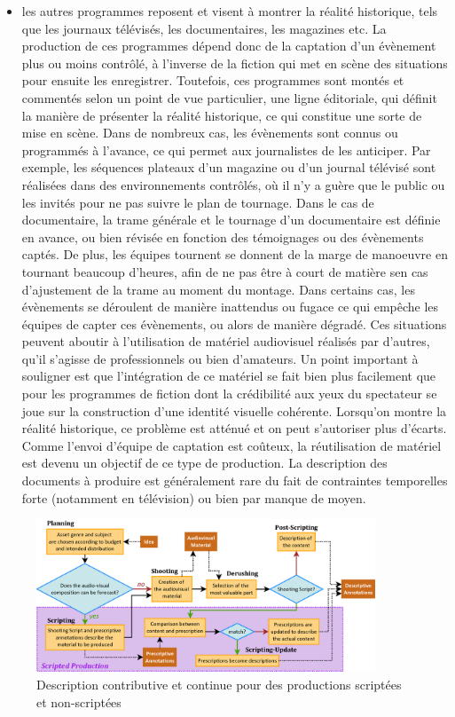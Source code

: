 \begin{itemize}
	\item les autres programmes reposent et visent à montrer la réalité historique, tels que les journaux télévisés, les documentaires, les magazines etc.
	La production de ces programmes dépend donc de la captation d'un évènement plus ou moins contrôlé, à l'inverse de la fiction qui met en scène des situations pour ensuite les enregistrer.
	Toutefois, ces programmes sont montés et commentés selon un point de vue particulier, une ligne éditoriale, qui définit la manière de présenter la réalité historique, ce qui constitue une sorte de mise en scène.
	Dans de nombreux cas, les évènements sont connus ou programmés à l'avance, ce qui permet aux journalistes de les anticiper. 
	Par exemple, les séquences plateaux d'un magazine ou d'un journal télévisé sont réalisées dans des environnements contrôlés, où il n'y a guère que le public ou les invités pour ne pas suivre le plan de tournage.
	Dans le cas de documentaire, la trame générale et le tournage d'un documentaire est définie en avance, ou bien révisée en fonction des témoignages ou des évènements captés. 
	De plus, les équipes tournent se donnent de la marge de manoeuvre en tournant beaucoup d'heures, afin de ne pas être à court de matière sen cas d'ajustement de la trame au moment du montage.
	Dans certains cas, les évènements se déroulent de manière inattendus ou fugace ce qui empêche les équipes de capter ces évènements, ou alors de manière dégradé.
	Ces situations peuvent aboutir à l'utilisation de matériel audiovisuel réalisés par d'autres, qu'il s'agisse de professionnels ou bien d'amateurs.
	Un point important à souligner est que l'intégration de ce matériel se fait bien plus facilement que pour les programmes de fiction dont la crédibilité aux yeux du spectateur se joue sur la construction d'une identité visuelle cohérente. 
	Lorsqu'on montre la réalité historique, ce problème est atténué et on peut s'autoriser plus d'écarts.
	Comme l'envoi d'équipe de captation est coûteux, la réutilisation de matériel est devenu un objectif de ce type de production. 
	La description des documents à produire est généralement rare du fait de contraintes temporelles forte (notamment en télévision) ou bien par manque de moyen.
\end{itemize}


\begin{figure}[ht!]
\centering
\includegraphics[width=0.9\textwidth]{./images/Approach-Logigram-v2.png}
\caption{Description contributive et continue pour des productions scriptées et non-scriptées}
\label{img:strat-annot}
\end{figure}

